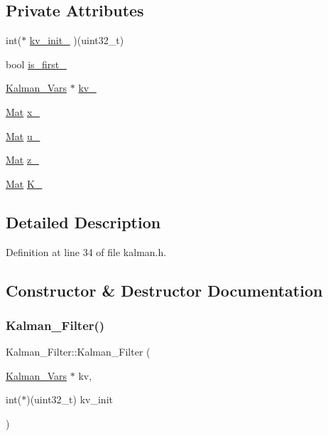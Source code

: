 \subsection*{Private Attributes}
\begin{DoxyCompactItemize}
\item 
int($\ast$ \mbox{\hyperlink{class_kalman___filter_acbf55b53754b79f0e97a6bfadcc4694e}{kv\+\_\+init\+\_\+}} )(uint32\+\_\+t)
\item 
bool \mbox{\hyperlink{class_kalman___filter_a31e5b1e4b7e5669a8021cab555aabf9a}{is\+\_\+first\+\_\+}}
\item 
\mbox{\hyperlink{struct_kalman___vars}{Kalman\+\_\+\+Vars}} $\ast$ \mbox{\hyperlink{class_kalman___filter_a21a6d19d0a7772e4d0156bb37e6600d7}{kv\+\_\+}}
\item 
\mbox{\hyperlink{class_mat}{Mat}} \mbox{\hyperlink{class_kalman___filter_a852bae6b48e7f39a957caf21696cae6c}{x\+\_\+}}
\item 
\mbox{\hyperlink{class_mat}{Mat}} \mbox{\hyperlink{class_kalman___filter_ae680b4ee331f43b1f2b7d44bed01c2d1}{u\+\_\+}}
\item 
\mbox{\hyperlink{class_mat}{Mat}} \mbox{\hyperlink{class_kalman___filter_a8f8715405aefe7c03198dbef3ac28b0c}{z\+\_\+}}
\item 
\mbox{\hyperlink{class_mat}{Mat}} \mbox{\hyperlink{class_kalman___filter_a28eb4e662deea59bae39358f9aba02e3}{K\+\_\+}}
\end{DoxyCompactItemize}


\subsection{Detailed Description}


Definition at line 34 of file kalman.\+h.



\subsection{Constructor \& Destructor Documentation}
\mbox{\label{class_kalman___filter_ac917b706405d2056e8edcb12469349d6}} 
\subsubsection{\texorpdfstring{Kalman\_Filter()}{Kalman\_Filter()}\hspace{0.1cm}{\footnotesize\ttfamily [1/3]}}
{\footnotesize\ttfamily Kalman\+\_\+\+Filter\+::\+Kalman\+\_\+\+Filter (\begin{DoxyParamCaption}\item[{\mbox{\hyperlink{struct_kalman___vars}{Kalman\+\_\+\+Vars}} $\ast$}]{kv,  }\item[{int($\ast$)(uint32\+\_\+t)}]{kv\+\_\+init }\end{DoxyParamCaption})\hspace{0.3cm}{\ttfamily [inline]}}



